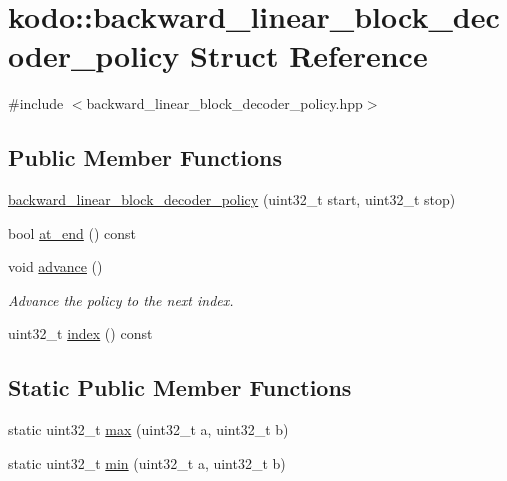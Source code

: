 \hypertarget{structkodo_1_1backward__linear__block__decoder__policy}{\section{kodo\-:\-:backward\-\_\-linear\-\_\-block\-\_\-decoder\-\_\-policy Struct Reference}
\label{structkodo_1_1backward__linear__block__decoder__policy}
}


{\ttfamily \#include $<$backward\-\_\-linear\-\_\-block\-\_\-decoder\-\_\-policy.\-hpp$>$}

\subsection*{Public Member Functions}
\begin{DoxyCompactItemize}
\item 
\hyperlink{structkodo_1_1backward__linear__block__decoder__policy_aa5a176074c514a5053c7957cc15f21ed}{backward\-\_\-linear\-\_\-block\-\_\-decoder\-\_\-policy} (uint32\-\_\-t start, uint32\-\_\-t stop)
\item 
bool \hyperlink{structkodo_1_1backward__linear__block__decoder__policy_aa5c55f6b51f7e2cd089a5283a216cfff}{at\-\_\-end} () const 
\item 
\hypertarget{structkodo_1_1backward__linear__block__decoder__policy_a836db8901ff970396ba1cf299bcca0bc}{void \hyperlink{structkodo_1_1backward__linear__block__decoder__policy_a836db8901ff970396ba1cf299bcca0bc}{advance} ()}\label{structkodo_1_1backward__linear__block__decoder__policy_a836db8901ff970396ba1cf299bcca0bc}

\begin{DoxyCompactList}\small\item\em Advance the policy to the next index. \end{DoxyCompactList}\item 
uint32\-\_\-t \hyperlink{structkodo_1_1backward__linear__block__decoder__policy_a73dfb932b9e0129e259571e47c85a431}{index} () const 
\end{DoxyCompactItemize}
\subsection*{Static Public Member Functions}
\begin{DoxyCompactItemize}
\item 
static uint32\-\_\-t \hyperlink{structkodo_1_1backward__linear__block__decoder__policy_af6c67c8abb15fb30c86985a44767f241}{max} (uint32\-\_\-t a, uint32\-\_\-t b)
\item 
static uint32\-\_\-t \hyperlink{structkodo_1_1backward__linear__block__decoder__policy_a188c9fc243d1d930b4655e587fe3bd4d}{min} (uint32\-\_\-t a, uint32\-\_\-t b)
\end{DoxyCompactItemize}
